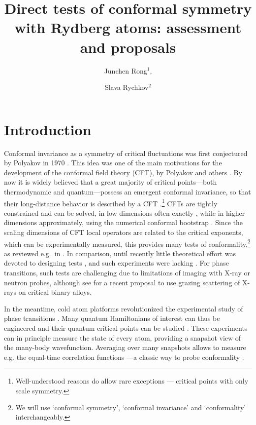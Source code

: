 \documentclass[a4paper,12pt]{article}
\title{Direct tests of conformal symmetry with Rydberg atoms: assessment and proposals}
\author{Junchen Rong$^1$,}
\author{Slava Rychkov$^2$}
\affiliation{$^1$CPHT, CNRS, \'Ecole Polytechnique, Institut Polytechnique de Paris, Palaiseau, France\\
$^2$Institut des Hautes \'Etudes Scientifiques, 91440 Bures-sur-Yvette, France}
\theoremstyle{remark}
\theoremstyle{theorem}
\begin{document}
 
	
	\maketitle
	
	\flushbottom


\flushbottom

\section{Introduction}

Conformal invariance as a symmetry of critical fluctuations was first
conjectured by Polyakov in 1970 {\cite{Polyakov:1970xd}}. This idea was one of
the main motivations for the development of the conformal field theory (CFT),
by Polyakov and others {\cite{Polyakov:1974gs,Belavin:1984vu}}. By now it is
widely believed that a great majority of critical points---both thermodynamic
and quantum---possess an emergent conformal invariance, so that their
long-distance behavior is described by a CFT
{\cite{Cardy1987,Cardy:1996xt,tsvelik,giamarchi2003quantum,sachdev,fradkin}}.\footnote{Well-understood
	reasons {\cite{Polchinski:1987dy,Nakayama:2013is}} do allow rare exceptions
	--- critical points with only scale symmetry.} CFTs are tightly constrained
and can be solved, in low dimensions often exactly
{\cite{DiFrancesco:1997nk}}, while in higher dimensions approximately, using
the numerical conformal bootstrap {\cite{Poland:2016chs,Poland:2018epd,Poland:2022qrs,Rychkov:2023wsd}}. Since the scaling
dimensions of CFT local operators are related to the critical exponents, which
can be experimentally measured, this provides many
 tests of conformality,\footnote{We will use
	`conformal symmetry', `conformal invariance' and `conformality'
	interchangeably.} as reviewed e.g.~in {\cite{Henkel1999,Rychkov:2025zks}}. In
comparison, until recently little theoretical effort was devoted to designing
 tests {\cite{Pokrovskii1973,Gompper1985}}, and such
experiments were lacking {\cite{Rychkov:2025zks}}. For
 phase transitions, such tests are
challenging due to limitations of imaging with X-ray or neutron probes, although see
{\cite{Podo:2026hfh}} for a recent proposal to use grazing scattering of
X-rays on critical binary alloys.

In the meantime, cold atom platforms {\cite{Browaeys:2020kzz,Morgado:2020jfo}}
revolutionized the experimental study of  phase
transitions
{\cite{Bernien:2017ubn,Scholl:2020hzx,Ebadi:2020ldi,Semeghini:2021wls}}. Many
quantum Hamiltonians of interest can thus be engineered and their quantum
critical points can be studied
{\cite{Keesling:2018ish,Fang:2024uyf,Sun:2026aqf}}. These experiments can in
principle measure the state of every atom, providing a snapshot view of the
many-body wavefunction. Averaging over many snapshots allows to measure e.g.
the equal-time correlation functions
{\cite{Fang:2024uyf,Emperauger:2025raf}}---a classic way to probe conformality
{\cite{Polyakov:1970xd}}.
\end{document}
